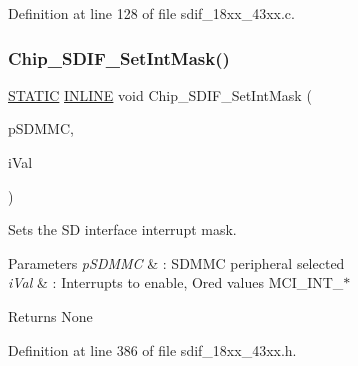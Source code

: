 Definition at line 128 of file sdif\+\_\+18xx\+\_\+43xx.\+c.

\mbox{\label{group___s_d_i_f__18_x_x__43_x_x_ga14b6323f09a6aec8289a4cf5a55afd63}} 
\subsubsection{\texorpdfstring{Chip\+\_\+\+S\+D\+I\+F\+\_\+\+Set\+Int\+Mask()}{Chip\_SDIF\_SetIntMask()}}
{\footnotesize\ttfamily \hyperlink{group___l_p_c___types___public___macros_ga10b2d890d871e1489bb02b7e70d9bdfb}{S\+T\+A\+T\+IC} \hyperlink{spifi__18xx__43xx_8h_a2eb6f9e0395b47b8d5e3eeae4fe0c116}{I\+N\+L\+I\+NE} void Chip\+\_\+\+S\+D\+I\+F\+\_\+\+Set\+Int\+Mask (\begin{DoxyParamCaption}\item[{\hyperlink{struct_l_p_c___s_d_m_m_c___t}{L\+P\+C\+\_\+\+S\+D\+M\+M\+C\+\_\+T} $\ast$}]{p\+S\+D\+M\+MC,  }\item[{uint32\+\_\+t}]{i\+Val }\end{DoxyParamCaption})}



Sets the SD interface interrupt mask. 


\begin{DoxyParams}{Parameters}
{\em p\+S\+D\+M\+MC} & \+: S\+D\+M\+MC peripheral selected \\
\hline
{\em i\+Val} & \+: Interrupts to enable, Or\textquotesingle{}ed values M\+C\+I\+\_\+\+I\+N\+T\+\_\+$\ast$ \\
\hline
\end{DoxyParams}
\begin{DoxyReturn}{Returns}
None 
\end{DoxyReturn}


Definition at line 386 of file sdif\+\_\+18xx\+\_\+43xx.\+h.

